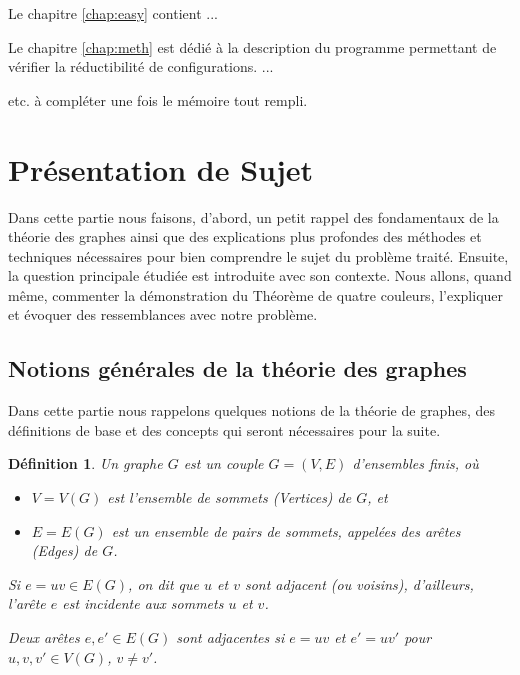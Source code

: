 \documentclass[10pt,a4paper]{article}
\newtheorem{definition}{Définition}
\begin{document}
Le chapitre \ref{chap:easy} contient ...

Le chapitre \ref{chap:meth} est dédié à la description du programme permettant de vérifier la réductibilité de configurations. ... 


etc. 
à compléter une fois le mémoire tout rempli.


\section{Présentation de Sujet}
\label{chap:pres}

Dans cette partie nous faisons, d'abord, un petit rappel des fondamentaux de la théorie des graphes ainsi que des explications plus profondes des méthodes et techniques nécessaires pour bien comprendre le sujet du problème traité. 
Ensuite, la question principale étudiée est introduite avec son contexte.
Nous allons, quand même, commenter la démonstration du Théorème de quatre couleurs, l'expliquer et évoquer des ressemblances avec notre problème. 

\subsection{Notions générales de la théorie des graphes}

Dans cette partie nous rappelons quelques notions de la théorie de graphes,  des définitions de base et des concepts qui seront nécessaires pour la suite. 

\begin{definition}
Un \emph{graphe} $G$ est un couple $G = (V,E)$ d'ensembles finis, où 
\begin{itemize}
\item $V=V(G)$ est l'ensemble de \emph{sommets (Vertices)} de $G$, et
\item $E=E(G)$ est un ensemble de pairs de sommets, appelées des \emph{arêtes (Edges)} de $G$.
\end{itemize}
Si $e = uv \in E(G)$, on dit que $u$ et $v$ sont \emph{adjacent} (ou \emph{voisins}), d'ailleurs, l'arête $e$ est \emph{incidente} aux sommets $u$ et $v$.

Deux arêtes $e,e'\in E(G)$ sont \emph{adjacentes} si $e=uv$ et $e'=uv'$ pour $u,v,v'\in V(G)$, $v\ne v'$.
\end{definition}
\end{document}
